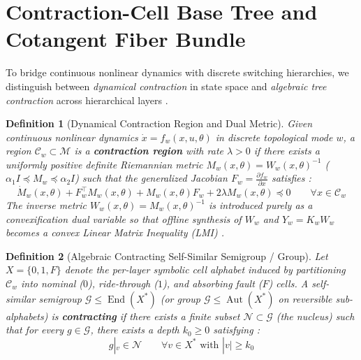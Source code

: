 \documentclass[11pt]{article}
\newtheorem{definition}{Definition}
\begin{document}
\section{Contraction-Cell Base Tree and Cotangent Fiber Bundle}

To bridge continuous nonlinear dynamics with discrete switching hierarchies, we distinguish between \emph{dynamical contraction} in state space \cite{LohmillerSlotine1998, Shiromoto2018} and \emph{algebraic tree contraction} across hierarchical layers \cite{Nekrashevych2005}.

\begin{definition}[Dynamical Contraction Region and Dual Metric]
Given continuous nonlinear dynamics $\dot{x} = f_w(x, u, \theta)$ in discrete topological mode $w$, a region $\mathcal{C}_w \subset \mathcal{M}$ is a \textbf{contraction region} with rate $\lambda > 0$ if there exists a uniformly positive definite Riemannian metric $M_w(x, \theta) = W_w(x, \theta)^{-1}$ ($\alpha_1 I \preceq M_w \preceq \alpha_2 I$) such that the generalized Jacobian $F_w = \frac{\partial f_w}{\partial x}$ satisfies \cite{LohmillerSlotine1998}:
\begin{equation}
\dot{M}_w(x, \theta) + F_w^\top M_w(x, \theta) + M_w(x, \theta) F_w + 2\lambda M_w(x, \theta) \preceq 0 \qquad \forall x \in \mathcal{C}_w
\end{equation}
The inverse metric $W_w(x, \theta) = M_w(x, \theta)^{-1}$ is introduced purely as a convexification dual variable so that offline synthesis of $W_w$ and $Y_w = K_w W_w$ becomes a convex Linear Matrix Inequality (LMI) \cite{Shiromoto2018}.
\end{definition}

\begin{definition}[Algebraic Contracting Self-Similar Semigroup / Group]
Let $X = \{0, 1, F\}$ denote the per-layer symbolic cell alphabet induced by partitioning $\mathcal{C}_w$ into nominal ($0$), ride-through ($1$), and absorbing fault ($F$) cells. A self-similar semigroup $\mathcal{G} \le \operatorname{End}(X^*)$ (or group $\mathcal{G} \le \operatorname{Aut}(X^*)$ on reversible sub-alphabets) is \textbf{contracting} if there exists a finite subset $\mathcal{N} \subset \mathcal{G}$ (the \emph{nucleus}) such that for every $g \in \mathcal{G}$, there exists a depth $k_0 \ge 0$ satisfying \cite{Nekrashevych2005}:
\begin{equation}
g|_v \in \mathcal{N} \qquad \forall v \in X^* \text{ with } |v| \ge k_0
\end{equation}
\end{definition}
\end{document}
